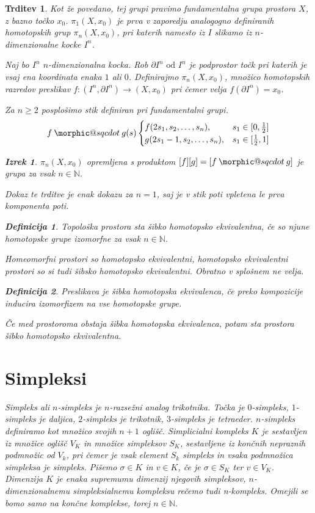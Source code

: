 \documentclass[a4paper,12pt]{article}
\makeatletter
\DeclareRobustCommand{\sqcdot}{\mathbin{\mathpalette\morphic@sqcdot\relax}}
\newcommand{\morphic@sqcdot}[2]{%
\sbox\z@{$\m@th#1\centerdot$}%
\ht\z@=.33333\ht\z@
\vcenter{\box\z@}%
}
\theoremstyle{definition}
\newtheorem{definicija}{Definicija}
\theoremstyle{plain}
\newtheorem{izrek}{Izrek}
\theoremstyle{definition}
\theoremstyle{plain}
\newtheorem{trditev}{Trditev}
\theoremstyle{plain}
\theoremstyle{plain}
\theoremstyle{plain}
\makeatother
\begin{document}
\begin{trditev}
Kot že povedano, tej grupi pravimo fundamentalna grupa prostora $X$, z bazno točko $x_0$. $\pi_1(X,x_0)$ je prva v zaporedju analogogno definiranih homotopskih grup $\pi_n(X,x_0)$, pri katerih namesto iz $I$ slikamo iz $n$-dimenzionalne kocke $I^n$.


Naj bo $I^n$ $n$-dimenzionalna kocka. Rob $\partial I^n \text{ od } I^n$ je podprostor točk pri katerih je vsaj ena koordinata enaka $1$ ali $0$. Definirajmo $\pi_n(X,x_0)$, množico homotopskih razredov preslikav $f:(I^n,\partial I^n) \rightarrow (X,x_0)$ pri čemer velja $f(\partial I^n) = x_0$.


Za $n\ge 2$ posplošimo stik definiran pri fundamentalni grupi.
$$ f\sqcdot g(s) \begin{cases}
    f(2s_1,s_2,\ldots,s_n), & s_1\in [0,\frac{1}{2}] \\
    g(2s_1-1,s_2,\ldots,s_n), & s_1 \in [\frac{1}{2},1]
\end{cases}
$$

\begin{izrek}
    $\pi_n(X,x_0)$ opremljena s produktom $[f][g] = [f\sqcdot g]$ je grupa za vsak $n \in \mathds{N}$.
\end{izrek}

Dokaz te trditve je enak dokazu za $n=1$, saj je v stik poti vpletena le prva komponenta poti.

\begin{definicija}
    Topološka prostora sta \textit{šibko homotopsko ekvivalentna}, če so njune homotopske grupe izomorfne za vsak $n \in \mathds{N}$.
\end{definicija}

Homeomorfni prostori so homotopsko ekvivalentni, homotopsko ekvivalentni prostori so si tudi šibsko homotopsko ekvivalentni. Obratno v splošnem ne velja.

\begin{definicija}
    Preslikava je \textit{šibka homotopska ekvivalenca}, če preko kompozicije inducira izomorfizem na vse homotopske grupe.
\end{definicija}
Če med prostoroma obstaja šibka homotopska ekvivalenca, potam sta prostora šibko homotopsko ekvivalentna.

\section{Simpleksi}

    \textit{Simpleks} ali $n$-simpleks je $n$-razsežni analog trikotnika. Točka je $0$-simpleks, $1$-simpleks je daljica, $2$-simpleks je trikotnik,
$3$-simpleks je tetraeder. $n$-simpleks definiramo kot množico svojih $n+1$ oglišč. \textit{Simplicialni kompleks $K$} je sestavljen iz množice oglišč $V_K$ in množice simpleksov $S_K$, sestavljene iz končnih nepraznih podmnožic od $V_k$, pri čemer je vsak element $S_k$ simpleks in vsaka podmnožica simpleksa je simpleks. Pišemo $\sigma \in K$ in $v \in K$, če je $\sigma \in S_K$ ter $v \in V_K$. Dimenzija $K$ je enaka supremumu dimenzij njegovih simpleksov, $n$-dimenzionalnemu simpleksialnemu kompleksu rečemo tudi \textit{n-kompleks}. Omejili se bomo samo na končne komplekse, torej $n \in \mathbb{N}$.


\end{trditev}
\end{document}
